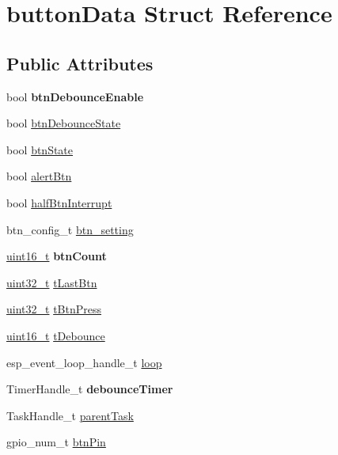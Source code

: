 \hypertarget{structbuttonData}{}\section{button\+Data Struct Reference}
\label{structbuttonData}
\subsection*{Public Attributes}
\begin{DoxyCompactItemize}
\item 
\mbox{\label{structbuttonData_abda9de5ae492f575ac826531b6c13249}} 
bool {\bfseries btn\+Debounce\+Enable}
\item 
bool \hyperlink{structbuttonData_afa9608155098295140e8fbae290c162c}{btn\+Debounce\+State}
\item 
bool \hyperlink{structbuttonData_a738bdc48430aa378eb278a8759cfcd0f}{btn\+State}
\item 
bool \hyperlink{structbuttonData_a4a60f7d8d5649d2470790f43244c8a3f}{alert\+Btn}
\item 
bool \hyperlink{structbuttonData_a04bf36fc0adf605c9f7352ab41af134c}{half\+Btn\+Interrupt}
\item 
btn\+\_\+config\+\_\+t \hyperlink{structbuttonData_a77b4789cd0f59ad4238149317efa20c0}{btn\+\_\+setting}
\item 
\mbox{\label{structbuttonData_a28871f000e0e6eeca11fb5bcf48cbe9c}} 
\hyperlink{vl53l0x__types_8h_a273cf69d639a59973b6019625df33e30}{uint16\+\_\+t} {\bfseries btn\+Count}
\item 
\hyperlink{vl53l0x__types_8h_a435d1572bf3f880d55459d9805097f62}{uint32\+\_\+t} \hyperlink{structbuttonData_ad8db5fdf61df4a87f43d487cc35d65bf}{t\+Last\+Btn}
\item 
\hyperlink{vl53l0x__types_8h_a435d1572bf3f880d55459d9805097f62}{uint32\+\_\+t} \hyperlink{structbuttonData_a325b9db7bb86ad831153318656891a8b}{t\+Btn\+Press}
\item 
\hyperlink{vl53l0x__types_8h_a273cf69d639a59973b6019625df33e30}{uint16\+\_\+t} \hyperlink{structbuttonData_a172467069638e0427e606e58408f25b3}{t\+Debounce}
\item 
esp\+\_\+event\+\_\+loop\+\_\+handle\+\_\+t \hyperlink{structbuttonData_a78456e82e30bcce95328039367be38dd}{loop}
\item 
\mbox{\label{structbuttonData_af98a75d1042dbd7254f92846ff4e572f}} 
Timer\+Handle\+\_\+t {\bfseries debounce\+Timer}
\item 
Task\+Handle\+\_\+t \hyperlink{structbuttonData_a9ab9462764966d50b44f0b8cfc0dd202}{parent\+Task}
\item 
gpio\+\_\+num\+\_\+t \hyperlink{structbuttonData_a22a4c876c877761e6380b7712e86db3b}{btn\+Pin}
\end{DoxyCompactItemize}


